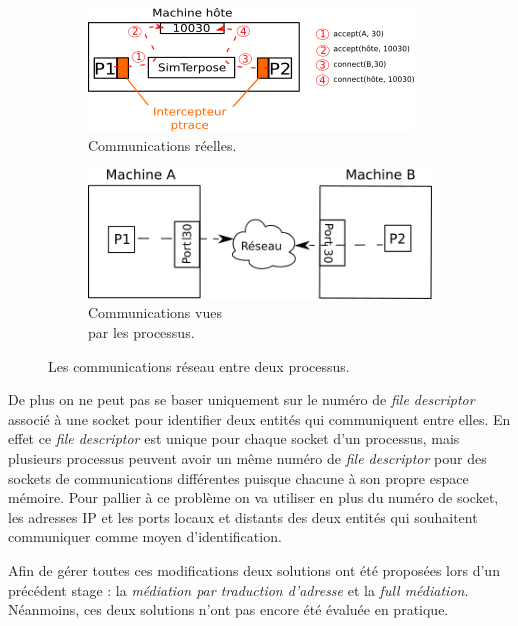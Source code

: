 \begin{figure}[H]
  \centering
  \begin{subfigure}{0.5\textwidth}
    \includegraphics[scale=0.8]{Pictures/png/Mediation_realite}
    \caption{Communications réelles.}
  \label{COMM_REALITE}
  \end{subfigure}
  \begin{subfigure}{0.25\textwidth}
  \includegraphics[scale=0.5]{Pictures/png/Mediation_VM}
  \caption{Communications vues \\ par les processus.}
  \label{COMM_VM}
  \end{subfigure}
  \caption{Les communications réseau entre deux processus.}
  \label{COMM}
\end{figure}

De plus on ne peut pas se baser uniquement sur le numéro de \textit{file
  descriptor} associé à une socket pour identifier deux entités qui communiquent
entre elles. En effet ce \textit{file descriptor} est unique pour chaque socket
d'un processus, mais plusieurs processus peuvent avoir un même numéro de
\textit{file descriptor} pour des sockets de communications différentes puisque
chacune à son propre espace mémoire. Pour pallier à ce problème on va utiliser
en plus du numéro de socket, les adresses IP et les ports locaux et distants des
deux entités qui souhaitent communiquer comme moyen d'identification.

Afin de gérer toutes ces modifications deux solutions ont été proposées lors
d'un précédent stage \citep{GUILLAUME:Interceptionsyscall}: la \textit{médiation
  par traduction d'adresse} et la \textit{full médiation}. Néanmoins, ces deux
solutions n'ont pas encore été évaluée en pratique.
 
